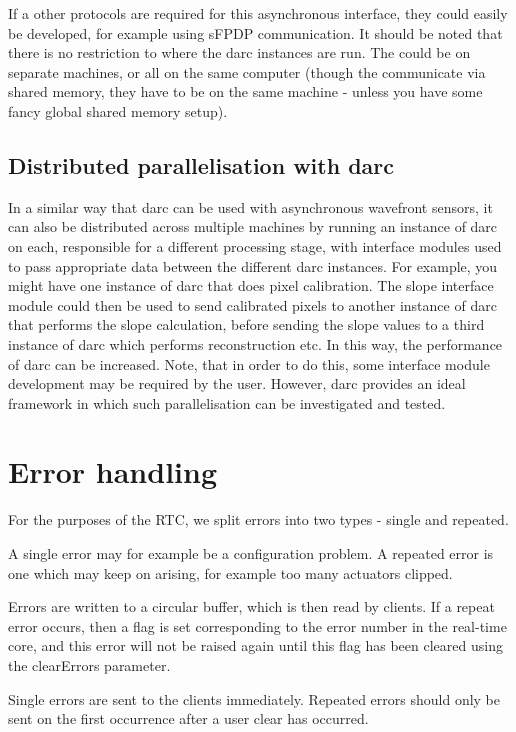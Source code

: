 \documentclass[a4,10pt]{article}
\begin{document}
If a other protocols are required for this asynchronous
interface, they could easily be developed, for example using sFPDP
communication.  It should be noted that there is no
restriction to where the darc instances are run.  The could be on
separate machines, or all on the same computer (though the communicate
via shared memory, they have to be on the same machine - unless you
have some fancy global shared memory setup).


\subsection{Distributed parallelisation with darc}
In a similar way that darc can be used with asynchronous wavefront
sensors, it can also be distributed across multiple machines by
running an instance of darc on each, responsible for a different
processing stage, with interface modules used to pass appropriate data
between the different darc instances.  For example, you might have one
instance of darc that does pixel calibration.  The slope interface
module could then be used to send calibrated pixels to another
instance of darc that performs the slope calculation, before sending
the slope values to a third instance of darc which performs
reconstruction etc.  In this way, the performance of darc can be
increased.  Note, that in order to do this, some interface module
development may be required by the user.  However, darc provides an
ideal framework in which such parallelisation can be investigated and
tested.


\section{Error handling}
For the purposes of the RTC, we split errors into two types - single
and repeated.  

A single error may for example be a configuration problem.  A repeated
error is one which may keep on arising, for example too many actuators
clipped.  

Errors are written to a circular buffer, which is then read by
clients.  If a repeat error occurs, then a flag is set corresponding
to the error number in the real-time core, and this error will not be
raised again until this flag has been cleared using the clearErrors
parameter.  

Single errors are sent to the clients immediately.  Repeated errors
should only be sent on the first occurrence after a user clear has
occurred.  
\end{document}
